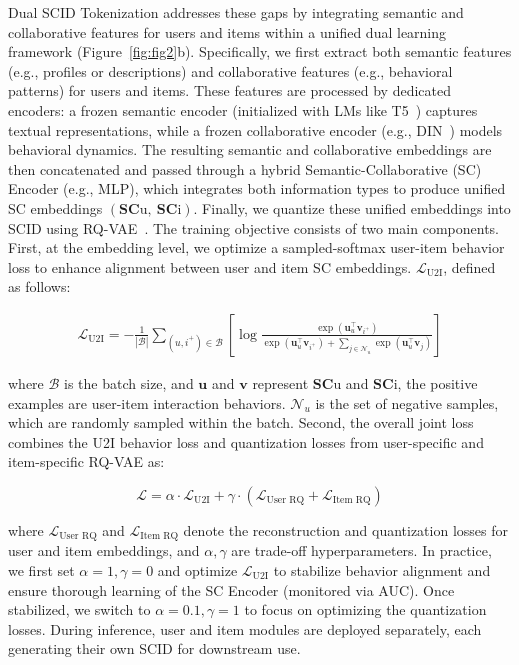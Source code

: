 \documentclass[letterpaper]{article} %
\begin{document}
%
Dual SCID Tokenization addresses these gaps by integrating semantic and collaborative features for users and items within a unified dual learning framework (Figure~\ref{fig:fig2}b). Specifically, we first extract both semantic features (e.g., profiles or descriptions) and collaborative features (e.g., behavioral patterns) for users and items. These features are processed by dedicated encoders: a frozen semantic encoder (initialized with LMs like T5~\cite{t5}) captures textual representations, while a frozen collaborative encoder (e.g., DIN~\cite{din}) models behavioral dynamics. The resulting semantic and collaborative embeddings are then concatenated and passed through a hybrid Semantic-Collaborative (SC) Encoder (e.g., MLP), which integrates both information types to produce unified SC embeddings $(\mathbf{SC}{\text{u}},\ \mathbf{SC}{\text{i}})$. Finally, we quantize these unified embeddings into SCID using RQ-VAE~\cite{rqvae}.
%
The training objective consists of two main components. First, at the embedding level, we optimize a sampled-softmax user-item behavior loss to enhance alignment between user and item SC embeddings.
$\mathcal{L}_{\text{U2I}}$, defined as follows:
\begin{small}
  \begin{align}
\mathcal{L}_{\text{U2I}} = -\frac{1}{|\mathcal{B}|} \sum_{(u,i^+) \in \mathcal{B}} \left[ \log \frac{\exp(\mathbf{u}_u^\top \mathbf{v}_{i^+})}{\exp(\mathbf{u}_u^\top \mathbf{v}_{i^+}) + \sum_{j \in \mathcal{N}_u} \exp(\mathbf{u}_u^\top \mathbf{v}_j)} \right]
\end{align}  
\end{small}
%

%
where $\mathcal{B}$ is the batch size, and $\mathbf{u}$ and $\mathbf{v}$ represent $\mathbf{SC}{\text{u}}$ and $\mathbf{SC}{\text{i}}$, the positive examples are user-item interaction behaviors. $\mathcal{N}_u$ is the set of negative samples, which are randomly sampled within the batch.
Second, the overall joint loss combines the U2I behavior loss and quantization losses from user-specific and item-specific RQ-VAE as:
\begin{small}
\begin{equation}
\mathcal{L} = \alpha \cdot \mathcal{L}_{\text{U2I}} + \gamma \cdot \left( \mathcal{L}_{\text{User RQ}} + \mathcal{L}_{\text{Item RQ}} \right)
\end{equation}
\end{small}
%

%
where $\mathcal{L}_{\text{User RQ}}$ and $\mathcal{L}_{\text{Item RQ}}$ denote the reconstruction and quantization losses for user and item embeddings, and $\alpha, \gamma$ are trade-off hyperparameters.
In practice,  we first set $\alpha=1, \gamma=0$ and optimize $\mathcal{L}_{\text{U2I}}$ to stabilize behavior alignment and ensure thorough learning of the SC Encoder (monitored via AUC). Once stabilized, we switch to $\alpha=0.1, \gamma=1$ to focus on optimizing the quantization losses. During inference, user and item modules are deployed separately, each generating their own SCID for downstream use.
%
\end{document}
